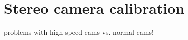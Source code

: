 \section{Stereo camera calibration}\label{sec:Calibration}
problems with high speed cams vs. normal cams!
